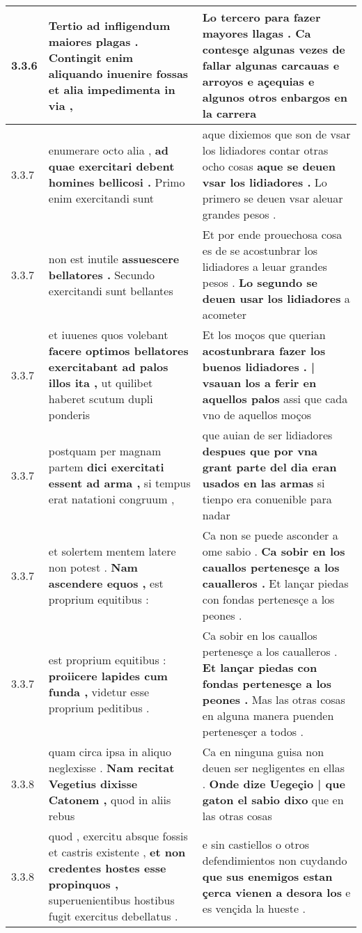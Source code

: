 \begin{tabular}{|p{1cm}|p{6.5cm}|p{6.5cm}|}
3.3.6 & Tertio ad infligendum maiores plagas . \textbf{ Contingit enim aliquando inuenire fossas } et alia impedimenta in via , & Lo tercero para fazer mayores llagas . \textbf{ Ca contesçe algunas vezes de fallar algunas carcauas e arroyos e açequias } e algunos otros enbargos en la carrera \\\hline
3.3.7 & enumerare octo alia , \textbf{ ad quae exercitari debent homines bellicosi . } Primo enim exercitandi sunt & aque dixiemos que son de vsar los lidiadores contar otras ocho cosas \textbf{ aque se deuen vsar los lidiadores . } Lo primero se deuen vsar aleuar grandes pesos . \\\hline
3.3.7 & non est inutile \textbf{ assuescere bellatores . } Secundo exercitandi sunt bellantes & Et por ende prouechosa cosa es de se acostunbrar los lidiadores a leuar grandes pesos . \textbf{ Lo segundo se deuen usar los lidiadores } a acometer \\\hline
3.3.7 & et iuuenes quos volebant \textbf{ facere optimos bellatores exercitabant ad palos illos ita , } ut quilibet haberet scutum dupli ponderis & Et los moços que querian \textbf{ acostunbrara fazer los buenos lidiadores . | vsauan los a ferir en aquellos palos } assi que cada vno de aquellos moços \\\hline
3.3.7 & postquam per magnam partem \textbf{ dici exercitati essent ad arma , } si tempus erat natationi congruum , & que auian de ser lidiadores \textbf{ despues que por vna grant parte del dia eran usados en las armas } si tienpo era conuenible para nadar \\\hline
3.3.7 & et solertem mentem latere non potest . \textbf{ Nam ascendere equos , } est proprium equitibus : & Ca non se puede asconder a ome sabio . \textbf{ Ca sobir en los cauallos pertenesçe a los caualleros . } Et lançar piedas con fondas pertenesçe a los peones . \\\hline
3.3.7 & est proprium equitibus : \textbf{ proiicere lapides cum funda , } videtur esse proprium peditibus . & Ca sobir en los cauallos pertenesçe a los caualleros . \textbf{ Et lançar piedas con fondas pertenesçe a los peones . } Mas las otras cosas en alguna manera puenden pertenesçer a todos . \\\hline
3.3.8 & quam circa ipsa in aliquo neglexisse . \textbf{ Nam recitat Vegetius dixisse Catonem , } quod in aliis rebus & Ca en ninguna guisa non deuen ser negligentes en ellas . \textbf{ Onde dize Uegeçio | que gaton el sabio dixo } que en las otras cosas \\\hline
3.3.8 & quod , exercitu absque fossis et castris existente , \textbf{ et non credentes hostes esse propinquos , } superuenientibus hostibus fugit exercitus debellatus . & e sin castiellos o otros defendimientos non cuydando \textbf{ que sus enemigos estan çerca vienen a desora los } e es vençida la hueste . \\\hline

\end{tabular}
